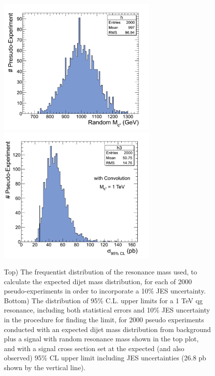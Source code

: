 \begin{figure}[!hb]
  \begin{center}
    \includegraphics[width=0.7\textwidth]{Figures/random_mass.pdf}
    \includegraphics[width=0.7\textwidth]{Figures/mass1TeV_JES_with_Convolution.pdf}
    \caption{Top)  The frequentist distribution of the resonance mass used, to calculate 
    the expected dijet mass distribution, for each of 2000 pseudo-experiments in order to incorporate
    a 10\% JES uncertainty.
    Bottom) The distribution of 95\% C.L. upper limits for a 1 TeV qg resonance, including 
    both statistical errors and 10\% JES uncertainty in the procedure for 
    finding the limit, 
    for 2000 pseudo experiments conducted with an expected dijet mass distribution 
    from background plus a signal with random resonance mass shown in the top
    plot, and with 
    a signal cross section set at the expected (and also observed) 95\% CL upper limit including JES uncertainties
    (26.8 pb shown by the vertical line).}
    \label{FrequentistSys}
  \end{center}
\end{figure}
